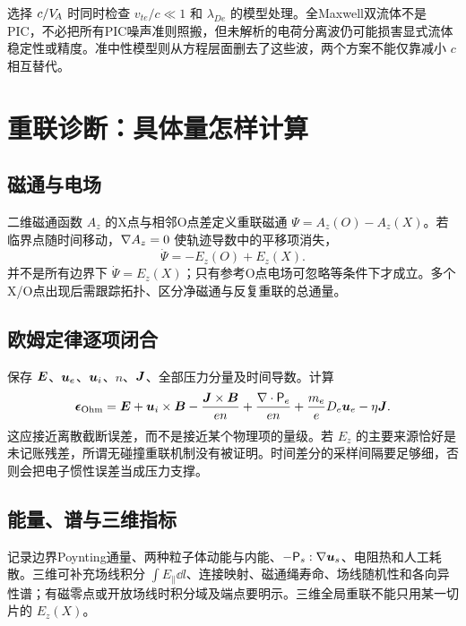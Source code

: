 选择 $c/V_{\!A}$ 时同时检查 $v_{te}/c\ll1$ 和 $\lambda_{De}$ 的模型处理。全Maxwell双流体不是PIC，不必把所有PIC噪声准则照搬，但未解析的电荷分离波仍可能损害显式流体稳定性或精度。准中性模型则从方程层面删去了这些波，两个方案不能仅靠减小 $c$ 相互替代。

\section{重联诊断：具体量怎样计算}
\subsection{磁通与电场}
二维磁通函数 $A_z$ 的X点与相邻O点差定义重联磁通 $\Psi=A_z(O)-A_z(X)$。若临界点随时间移动，$\nabla A_z=0$ 使轨迹导数中的平移项消失，
\begin{equation}\dot\Psi=-E_z(O)+E_z(X).
\end{equation}
并不是所有边界下 $\dot\Psi=E_z(X)$；只有参考O点电场可忽略等条件下才成立。多个X/O点出现后需跟踪拓扑、区分净磁通与反复重联的总通量。

\subsection{欧姆定律逐项闭合}
保存 $\bm{E}$、$\bm{u}_e$、$\bm{u}_i$、$n$、$\bm{J}$、全部压力分量及时间导数。计算
\begin{equation}\bm{\epsilon}_{\rm Ohm}=\bm{E}+\bm{u}_i\times\bm{B}-{\bm{J}\times\bm{B}\over en}+{\nabla\cdot\mathsf P_e\over en}+{m_e\over e}D_e\bm{u}_e-\eta\bm{J}.
\end{equation}
这应接近离散截断误差，而不是接近某个物理项的量级。若 $E_z$ 的主要来源恰好是未记账残差，所谓无碰撞重联机制没有被证明。时间差分的采样间隔要足够细，否则会把电子惯性误差当成压力支撑。

\subsection{能量、谱与三维指标}
记录边界Poynting通量、两种粒子体动能与内能、$-\mathsf P_s:\nabla\bm{u}_s$、电阻热和人工耗散。三维可补充场线积分 $\int E_\parallel\dd l$、连接映射、磁通绳寿命、场线随机性和各向异性谱；有磁零点或开放场线时积分域及端点要明示。三维全局重联不能只用某一切片的 $E_z(X)$。

